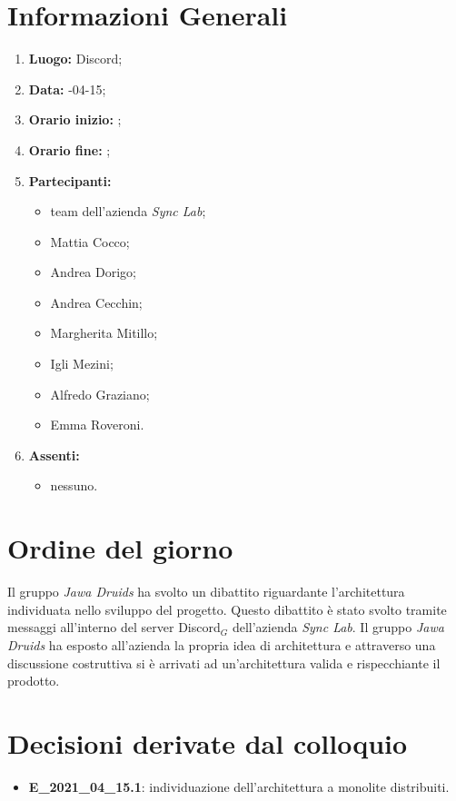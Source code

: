\newpage
\section{Informazioni Generali}
\begin{enumerate}
	\item \textbf{Luogo:} \normalfont Discord;
	\item \textbf{Data:} -04-15;
	\item \textbf{Orario inizio:} ;
	\item \textbf{Orario fine:} ;
	\item \textbf{Partecipanti:}
	\begin{itemize}
		\item team dell'azienda \textit{Sync Lab};
		\item Mattia Cocco;
		\item Andrea Dorigo;
		\item Andrea Cecchin;
		\item Margherita Mitillo;
		\item Igli Mezini;
		\item Alfredo Graziano;
		\item Emma Roveroni.
	\end{itemize}
	\item \textbf{Assenti:}
	\begin{itemize}
		\item nessuno.
	\end{itemize}
\end{enumerate}
\section{Ordine del giorno}
Il gruppo \textit{Jawa Druids} ha svolto un dibattito riguardante l'architettura individuata nello sviluppo del progetto. 
Questo dibattito è stato svolto tramite messaggi all'interno del server Discord$_G$ dell'azienda \textit{Sync Lab}.
Il gruppo \textit{Jawa Druids} ha esposto all'azienda la propria idea di architettura e attraverso una discussione costruttiva si è arrivati ad un'architettura valida e rispecchiante il prodotto. 
\section{Decisioni derivate dal colloquio}
\begin{itemize}
	\item \textbf{E\_2021\_04\_15.1}: individuazione dell'architettura a monolite distribuiti.
\end{itemize}